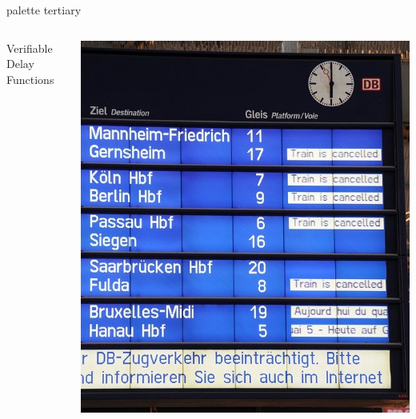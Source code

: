 \documentclass[aspectratio=169]{beamer}
\begin{document}
\begin{frame}[plain]
  \begin{beamercolorbox}[sep=0.1px,center,wd=\paperwidth,ht=\paperheight]{palette tertiary}
    \begin{columns}
      \begin{column}{0.55\textwidth}
        \Huge\centering Verifiable\\ Delay Functions
      \end{column}
      \begin{column}{0.45\textwidth}
        \includegraphics[height=\paperheight]{db.jpg}
      \end{column}
    \end{columns}
  \end{beamercolorbox}
\end{frame}

\end{document}
